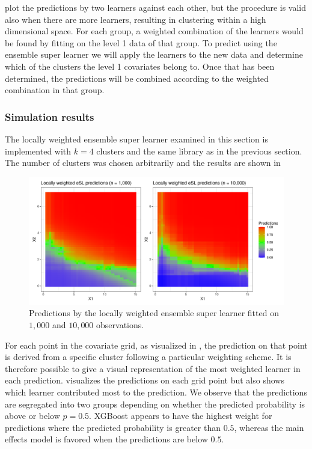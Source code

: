 \documentclass[./main.tex]{subfiles}
\begin{document}
 plot the predictions by two learners against each other, but the procedure is valid also when there are more learners, resulting in clustering within a high dimensional space. For each group, a weighted combination of the learners would be found by fitting on the level 1 data of that group. To predict using the ensemble super learner we will apply the learners to the new data and determine which of the clusters the level 1 covariates belong to. Once that has been determined, the predictions will be combined according to the weighted combination in that group. 

\subsubsection{Simulation results}
The locally weighted ensemble super learner examined in this section is implemented with $ k = 4 $ clusters and the same library as in the previous section. The number of clusters was chosen arbitrarily and the results are shown in 
\begin{figure}[H]
    \centering
    \includegraphics[width=\textwidth]{figures/esl_preds_lw.pdf}
    \caption{Predictions by the locally weighted ensemble super learner fitted on $ 1,000 $ and $ 10,000 $ observations.}
    \label{fig:esl_preds_lw}
\end{figure}
For each point in the covariate grid, as visualized in , the prediction on that point is derived from a specific cluster following a particular weighting scheme. It is therefore possible to give a visual representation of the most weighted learner in each prediction.  visualizes the predictions on each grid point but also shows which learner contributed most to the prediction. We observe that the predictions are segregated into two groups depending on whether the predicted probability is above or below $ p = 0.5 $. XGBoost appears to have the highest weight for predictions where the predicted probability is greater than $ 0.5 $, whereas the main effects model is favored when the predictions are below $ 0.5 $. 
\end{document}

